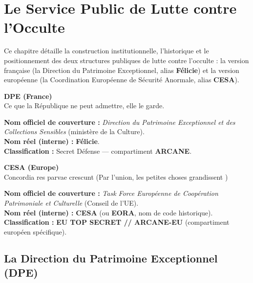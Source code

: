 \documentclass[10pt,a5paper,twoside]{book}
\begin{document}
\chapter{Le Service Public de Lutte contre l'Occulte}

Ce chapitre détaille la construction institutionnelle, l'historique et le
positionnement des deux structures publiques de lutte contre l'occulte :
la version française (la Direction du Patrimoine Exceptionnel, alias
\textbf{Félicie}) et la version européenne (la Coordination Européenne de
Sécurité Anormale, alias \textbf{CESA}).

\clearpage

\begin{shaded}
\begin{center}
\textbf{DPE (France)} \\ \og Ce que la République ne peut admettre, elle le garde. \fg
\end{center}
\textbf{Nom officiel de couverture :} \textit{Direction du Patrimoine Exceptionnel et des Collections Sensibles} (ministère de la Culture). \\
\textbf{Nom réel (interne) :} \textbf{Félicie}. \\
\textbf{Classification :} Secret Défense --- compartiment \textbf{ARCANE}.
\end{shaded}

\begin{shaded}
\begin{center}
\textbf{CESA (Europe)} \\ \og Concordia res parvae crescunt \fg{} (\og Par l'union, les petites choses grandissent \fg)
\end{center}
\textbf{Nom officiel de couverture :} \textit{Task Force Européenne de Coopération Patrimoniale et Culturelle} (Conseil de l'UE). \\
\textbf{Nom réel (interne) :} \textbf{CESA} (ou \textbf{EORA}, nom de code historique). \\
\textbf{Classification :} \textbf{EU TOP SECRET // ARCANE-EU} (compartiment européen spécifique).
\end{shaded}

\newpage


\section{La Direction du Patrimoine Exceptionnel (DPE)}
\end{document}
